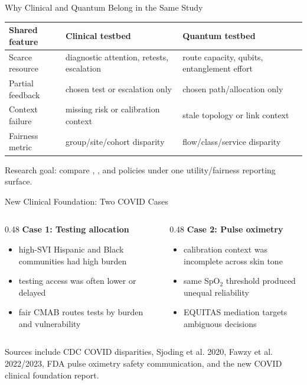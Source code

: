 \begin{frame}{Why Clinical and Quantum Belong in the Same Study}
\begin{center}
\begin{tabular}{p{}p{}p{}}
\toprule
\textbf{Shared feature} & \textbf{Clinical testbed} & \textbf{Quantum testbed} \\
\midrule
Scarce resource & diagnostic attention, retests, escalation & route capacity, qubits, entanglement effort \\
Partial feedback & chosen test or escalation only & chosen path/allocation only \\
Context failure & missing risk or calibration context & stale topology or link context \\
Fairness metric & group/site/cohort disparity & flow/class/service disparity \\
\bottomrule
\end{tabular}
\end{center}
\vspace{0.5em}
\alert{Research goal:} compare \mab, \cmab, and \icmab policies under one utility/fairness reporting surface.
\end{frame}

\begin{frame}{New Clinical Foundation: Two COVID Cases}
\begin{columns}[T]
\begin{column}{0.48\textwidth}
\textbf{Case 1: Testing allocation}
\begin{itemize}
    \item high-SVI Hispanic and Black communities had high burden
    \item testing access was often lower or delayed
    \item fair CMAB routes tests by burden and vulnerability
\end{itemize}
\end{column}
\begin{column}{0.48\textwidth}
\textbf{Case 2: Pulse oximetry}
\begin{itemize}
    \item calibration context was incomplete across skin tone
    \item same SpO$_2$ threshold produced unequal reliability
    \item EQUITAS mediation targets ambiguous decisions
\end{itemize}
\end{column}
\end{columns}
\vspace{0.4em}
\scriptsize Sources include CDC COVID disparities, Sjoding et al. 2020, Fawzy et al. 2022/2023, FDA pulse oximetry safety communication, and the new COVID clinical foundation report.
\end{frame}
